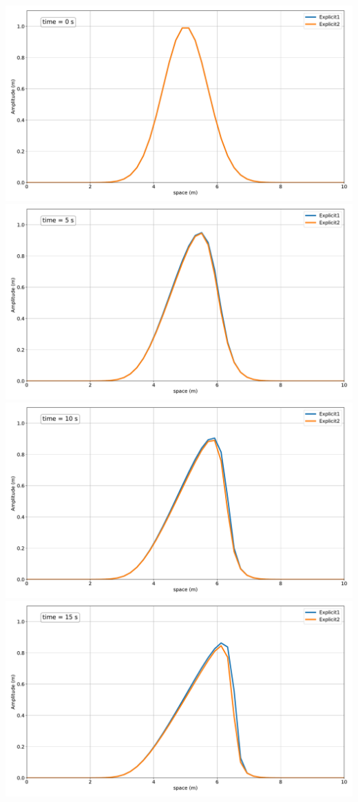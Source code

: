\includegraphics[width=\linewidth]{../BurgersEquation/images/expl0.pdf}
\includegraphics[width=\linewidth]{../BurgersEquation/images/expl1.pdf}
\includegraphics[width=\linewidth]{../BurgersEquation/images/expl2.pdf}
\includegraphics[width=\linewidth]{../BurgersEquation/images/expl3.pdf}
